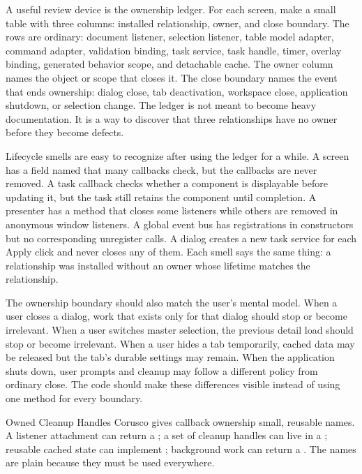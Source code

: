 A useful review device is the ownership ledger. For each screen, make a small
table with three columns: installed relationship, owner, and close boundary.
The rows are ordinary: document listener, selection listener, table model
adapter, command adapter, validation binding, task service, task handle, timer,
overlay binding, generated behavior scope, and detachable cache. The owner
column names the object or scope that closes it. The close boundary names the
event that ends ownership: dialog close, tab deactivation, workspace close,
application shutdown, or selection change. The ledger is not meant to become
heavy documentation. It is a way to discover that three relationships have no
owner before they become defects.

Lifecycle smells are easy to recognize after using the ledger for a while. A
screen has a field named  that many callbacks check, but the
callbacks are never removed. A task callback checks whether a component is
displayable before updating it, but the task still retains the component until
completion. A presenter has a  method that closes some listeners
while others are removed in anonymous window listeners. A global event bus has
registrations in constructors but no corresponding unregister calls. A dialog
creates a new task service for each Apply click and never closes any of them.
Each smell says the same thing: a relationship was installed without an owner
whose lifetime matches the relationship.

The ownership boundary should also match the user's mental model. When a user
closes a dialog, work that exists only for that dialog should stop or become
irrelevant. When a user switches master selection, the previous detail load
should stop or become irrelevant. When a user hides a tab temporarily, cached
data may be released but the tab's durable settings may remain. When the
application shuts down, user prompts and cleanup may follow a different policy
from ordinary close. The code should make these differences visible instead of
using one  method for every boundary.

\begin{coruscobox}{Owned Cleanup Handles}
Corusco gives callback ownership small, reusable names. A listener attachment
can return a ; a set of cleanup handles can live in a
; reusable cached state can implement ;
background work can return a . The names are plain because they
must be used everywhere.
\end{coruscobox}

